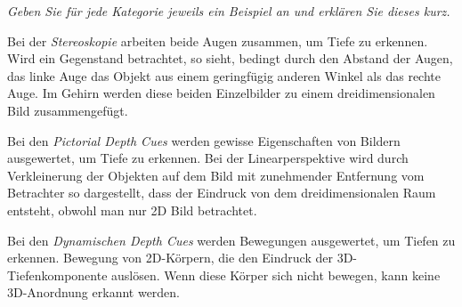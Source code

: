 \documentclass[
  ngerman,
  DIV=14
]{scrartcl}
\begin{document}
\bigskip\noindent
\emph{Geben Sie für jede Kategorie jeweils ein Beispiel an und erklären Sie dieses kurz.}
\par\medskip\noindent
Bei der \emph{Stereoskopie} arbeiten beide Augen zusammen, um Tiefe zu erkennen. Wird ein Gegenstand betrachtet, so sieht, bedingt durch den Abstand der Augen, das linke Auge das Objekt aus einem geringfügig anderen Winkel als das rechte Auge. Im Gehirn werden diese beiden Einzelbilder zu einem dreidimensionalen Bild zusammengefügt.

Bei den \emph{Pictorial Depth Cues} werden gewisse Eigenschaften von Bildern ausgewertet, um Tiefe zu erkennen. Bei der Linearperspektive wird durch Verkleinerung der Objekten auf dem Bild mit zunehmender Entfernung vom Betrachter so dargestellt, dass der Eindruck von dem dreidimensionalen Raum entsteht, obwohl man nur 2D Bild betrachtet.

Bei den \emph{Dynamischen Depth Cues} werden Bewegungen ausgewertet, um Tiefen zu erkennen. Bewegung von 2D-Körpern, die den Eindruck der 3D-Tiefenkomponente auslösen. Wenn diese Körper sich nicht bewegen, kann keine 3D-Anordnung erkannt werden.
\end{document}
